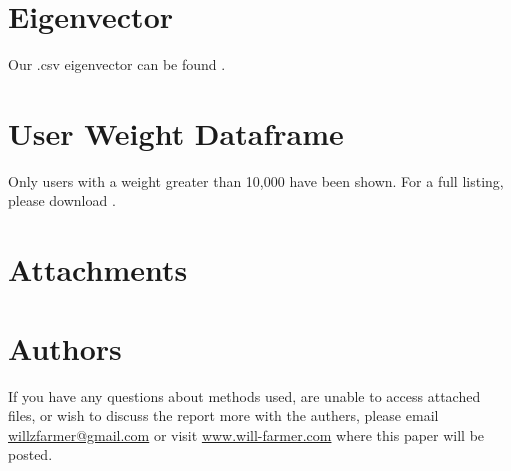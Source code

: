 \documentclass[10pt]{report}
\begin{document}
\section{Eigenvector}\label{app:results}
Our .csv eigenvector can be found .

\section{User Weight Dataframe}\label{app:userweights}
Only users with a weight greater than 10,000 have been shown. For a full listing, please download .


\section{Attachments}


\section{Authors}
If you have any questions about methods used, are unable to access attached files, or wish to discuss the report more with the authers, please email \url{willzfarmer@gmail.com} or visit \url{www.will-farmer.com} where this paper will be posted.
\end{document}
